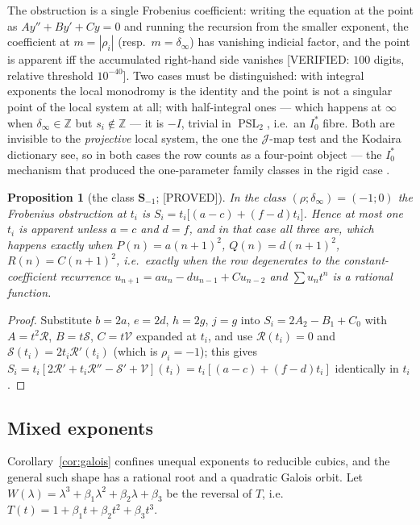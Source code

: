 \documentclass[11pt,reqno]{amsart}
\theoremstyle{plain}
\newtheorem{proposition}[theorem]{Proposition}
\theoremstyle{definition}
\theoremstyle{remark}
\theoremstyle{plain}
\newcommand{\Z}{\mathbb{Z}}
\DeclareMathOperator{\PSL}{PSL}
\newcommand{\Jm}{\mathcal J}
\newcommand{\Rc}{\mathcal R}
\newcommand{\Sc}{\mathcal S}
\newcommand{\Vc}{\mathcal V}
\newcommand{\Proved}{\textup{\textsf{[PROVED]}}}
\newcommand{\Verified}[1]{\textup{\textsf{[VERIFIED: #1]}}}
\begin{document}
The obstruction is a single Frobenius coefficient: writing the equation at the
point as $Ay''+By'+Cy=0$ and running the recursion from the smaller exponent, the
coefficient at $m=|\rho_i|$ (resp.\ $m=\delta_\infty$) has vanishing indicial
factor, and the point is apparent iff the accumulated right-hand side vanishes
\Verified{$100$ digits, relative threshold $10^{-40}$}. Two cases must be
distinguished: with integral exponents the local monodromy is the identity and
the point is not a singular point of the local system at all; with half-integral
ones --- which happens at $\infty$ when $\delta_\infty\in\Z$ but $s_i\notin\Z$ ---
it is $-I$, trivial in $\PSL_2$, i.e.\ an $I_0^*$ fibre. Both are invisible to
the \emph{projective} local system, the one the $\Jm$-map test and the Kodaira
dictionary see, so in both cases the row counts as a four-point object --- the
$I_0^*$ mechanism that produced the one-parameter family classes in the rigid
case \cite{CLASS}.

\begin{proposition}[the class $\mathbf S_{-1}$; \Proved]\label{prop:F5}
In the class $(\rho;\delta_\infty)=(-1;0)$ the Frobenius obstruction at $t_i$ is
$S_i=t_i\bigl[(a-c)+(f-d)t_i\bigr]$. Hence at most one $t_i$ is apparent unless
$a=c$ and $d=f$, and in that case all three are, which happens exactly when
$P(n)=a(n+1)^2$, $Q(n)=d(n+1)^2$, $R(n)=C(n+1)^2$, i.e.\ exactly when the row
degenerates to the constant-coefficient recurrence
$u_{n+1}=au_n-du_{n-1}+Cu_{n-2}$ and $\sum u_nt^n$ is a rational function.
\end{proposition}

\begin{proof}
Substitute $b=2a$, $e=2d$, $h=2g$, $j=g$ into $S_i=2A_2-B_1+C_0$ with
$A=t^2\Rc$, $B=t\Sc$, $C=t\Vc$ expanded at $t_i$, and use $\Rc(t_i)=0$ and
$\Sc(t_i)=2t_i\Rc'(t_i)$ (which is $\rho_i=-1$); this gives
$S_i=t_i[2\Rc'+t_i\Rc''-\Sc'+\Vc](t_i)=t_i[(a-c)+(f-d)t_i]$ identically in
$t_i$.
\end{proof}

\subsection{Mixed exponents}\label{sec:mixdict}
Corollary~\ref{cor:galois} confines unequal exponents to reducible cubics, and
the general such shape has a rational root and a quadratic Galois orbit. Let
$W(\lambda)=\lambda^3+\beta_1\lambda^2+\beta_2\lambda+\beta_3$ be the reversal of
$T$, i.e.\ $T(t)=1+\beta_1t+\beta_2t^2+\beta_3t^3$.
\end{document}
